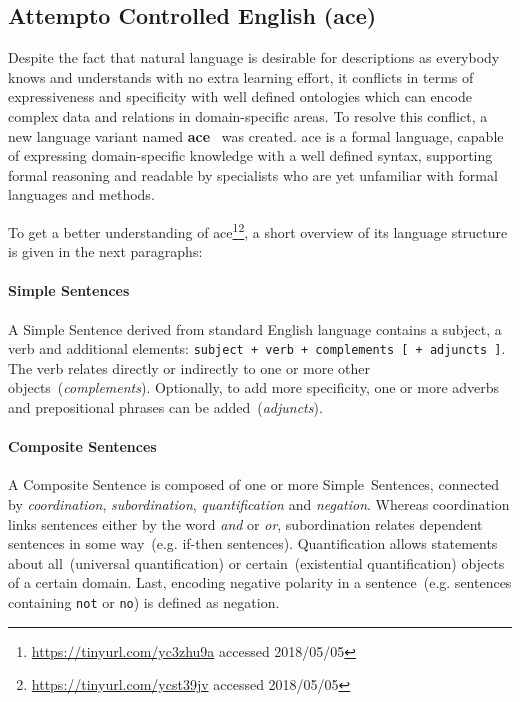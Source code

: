 \subsection{Attempto Controlled English (\gls{ace})}
Despite the fact that natural language is desirable for descriptions as everybody knows and understands with no extra learning effort, it conflicts in terms of expressiveness and specificity with well defined ontologies which can encode complex data and relations in domain-specific areas. To resolve this conflict, a new language variant named \textbf{\gls{ace}}~\cite{fuchs2008} was created. \gls{ace} is a formal language, capable of expressing domain-specific knowledge with a well defined syntax, supporting formal reasoning and readable by specialists who are yet unfamiliar with formal languages and methods.

To get a better understanding of \gls{ace}\footnote{\url{https://tinyurl.com/yc3zhu9a} accessed 2018/05/05}\footnote{\url{https://tinyurl.com/ycst39jv} accessed 2018/05/05}, a short overview of its language structure is given in the next paragraphs:
 
\paragraph{Simple Sentences} A Simple Sentence derived from standard English language contains a subject, a verb and additional elements: \texttt{subject + verb + complements~[~+~adjuncts~]}. The verb relates directly or indirectly to one or more other objects~(\textit{complements}). Optionally, to add more specificity, one or more adverbs and prepositional phrases can be added~(\textit{adjuncts}). 

\paragraph{Composite Sentences} A Composite Sentence is composed of one or more Simple~Sentences, connected by \textit{coordination},
\textit{subordination}, \textit{quantification} and \textit{negation}. Whereas coordination links sentences either by the word \textit{and} or \textit{or}, subordination relates dependent sentences in some way~(e.g. if-then sentences). Quantification allows statements about all~(universal quantification) or certain~(existential quantification) objects of a certain domain. Last, encoding negative polarity in a sentence~(e.g. sentences containing \texttt{not} or \texttt{no}) is defined as negation. 

